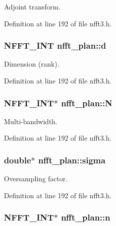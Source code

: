 Adjoint transform. 



Definition at line 192 of file nfft3.\-h.

\hypertarget{structnfft__plan_af313a7301847950b184e7eaa336c2535}{
\subsubsection[{d}]{\setlength{\rightskip}{0pt plus 5cm}N\-F\-F\-T\-\_\-\-I\-N\-T nfft\-\_\-plan\-::d}}\label{structnfft__plan_af313a7301847950b184e7eaa336c2535}


Dimension (rank). 



Definition at line 192 of file nfft3.\-h.

\hypertarget{structnfft__plan_af100fe04b5d67e9b890e787b4e994f97}{
\subsubsection[{N}]{\setlength{\rightskip}{0pt plus 5cm}N\-F\-F\-T\-\_\-\-I\-N\-T$\ast$ nfft\-\_\-plan\-::\-N}}\label{structnfft__plan_af100fe04b5d67e9b890e787b4e994f97}


Multi-\/bandwidth. 



Definition at line 192 of file nfft3.\-h.

\hypertarget{structnfft__plan_a09340f6465c23f3d94636f4f0da30f8a}{
\subsubsection[{sigma}]{\setlength{\rightskip}{0pt plus 5cm}double$\ast$ nfft\-\_\-plan\-::sigma}}\label{structnfft__plan_a09340f6465c23f3d94636f4f0da30f8a}


Oversampling factor. 



Definition at line 192 of file nfft3.\-h.

\hypertarget{structnfft__plan_a8205995ab8bacd26adecbc93c73a0914}{
\subsubsection[{n}]{\setlength{\rightskip}{0pt plus 5cm}N\-F\-F\-T\-\_\-\-I\-N\-T$\ast$ nfft\-\_\-plan\-::n}}\label{structnfft__plan_a8205995ab8bacd26adecbc93c73a0914}


